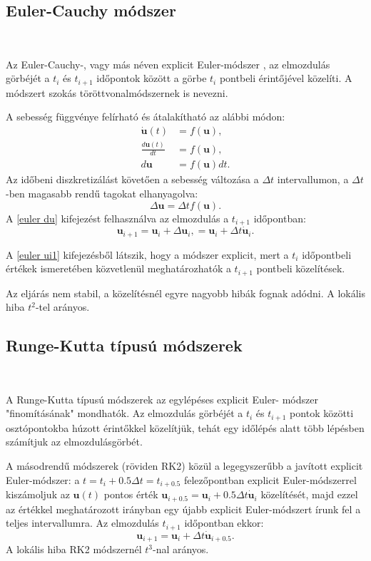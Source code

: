 \subsection{Euler-Cauchy módszer}

{\ }

Az Euler-Cauchy-, vagy más néven explicit Euler-módszer \cite{nummat}, az elmozdulás görbéjét a $t_i$ és $t_{i+1}$ időpontok között a görbe $t_i$ pontbeli érintőjével közelíti. A módszert  szokás töröttvonalmódszernek is nevezni.

A sebesség függvénye felírható és átalakítható az alábbi módon:
\begin{align*}
\mathbf{\dot{u}}(t) & = f(\mathbf{u}), \\
\frac{d\mathbf{u}(t)}{dt} & = f(\mathbf{u}), \\
d\mathbf{u} & = f(\mathbf{u})dt.
\end{align*}
Az időbeni diszkretizálást követően  a sebesség változása a $\Delta{t}$ intervallumon, a $\Delta{t}$-ben magasabb rendű tagokat elhanyagolva:
\begin{equation}
\label{euler du}
\Delta{\mathbf{u}} = \Delta{t}f(\mathbf{u}).
\end{equation}
A \eqref{euler du} kifejezést felhasználva az elmozdulás a $t_{i+1}$ időpontban:
\begin{equation}
\label{euler ui1}
\mathbf{u}_{i+1}  = \mathbf{u}_i+\Delta{\mathbf{u}}_i,  = \mathbf{u}_i+\Delta{t}\mathbf{\dot{u}}_i.
\end{equation}

A \eqref{euler ui1} kifejezésből látszik, hogy a módszer explicit, mert a $t_i$ időpontbeli értékek ismeretében közvetlenül meghatározhatók a $t_{i+1}$ pontbeli közelítések. 

Az eljárás nem stabil, a közelítésnél egyre nagyobb hibák fognak adódni. A lokális hiba $t^2$-tel arányos.


\subsection{Runge-Kutta típusú módszerek}

{\ }

A Runge-Kutta típusú módszerek \cite{nummat} az egylépéses explicit Euler- módszer "finomításának" mondhatók. Az elmozdulás görbéjét a $t_i$ és $t_{i+1}$ pontok közötti osztópontokba húzott érintőkkel közelítjük, tehát egy időlépés alatt több lépésben számítjuk az elmozdulásgörbét.

A másodrendű módszerek (röviden RK2) közül a legegyszerűbb a javított explicit Euler-módszer: a $t = t_{i}+0.5\Delta{t} = t_{i+0.5}$ felezőpontban explicit Euler-módszerrel kiszámoljuk az $\mathbf{u}(t)$ pontos érték $\mathbf{u}_{i+0.5} = \mathbf{u}_i+0.5\Delta{t}\mathbf{\dot{u}}_i$ közelítését, majd ezzel az értékkel meghatározott irányban egy újabb explicit Euler-módszert írunk fel a teljes intervallumra. Az elmozdulás $t_{i+1}$ időpontban ekkor:
\begin{equation*}
\mathbf{u}_{i+1} = \mathbf{u}_i+ \Delta{t}\mathbf{\dot{u}}_{i+0.5}.
\end{equation*}
A lokális hiba RK2 módszernél $t^3$-nal arányos.

